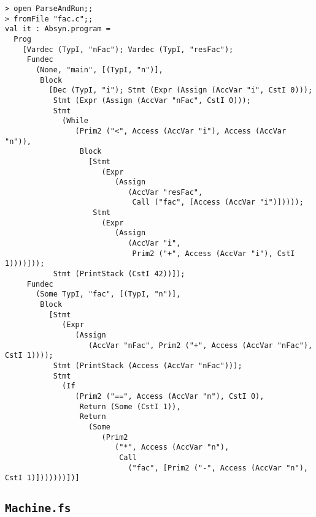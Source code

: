 \bgroup
\footnotesize
\begin{verbatim}
> open ParseAndRun;;
> fromFile "fac.c";;
val it : Absyn.program =
  Prog
    [Vardec (TypI, "nFac"); Vardec (TypI, "resFac");
     Fundec
       (None, "main", [(TypI, "n")],
        Block
          [Dec (TypI, "i"); Stmt (Expr (Assign (AccVar "i", CstI 0)));
           Stmt (Expr (Assign (AccVar "nFac", CstI 0)));
           Stmt
             (While
                (Prim2 ("<", Access (AccVar "i"), Access (AccVar "n")),
                 Block
                   [Stmt
                      (Expr
                         (Assign
                            (AccVar "resFac",
                             Call ("fac", [Access (AccVar "i")]))));
                    Stmt
                      (Expr
                         (Assign
                            (AccVar "i",
                             Prim2 ("+", Access (AccVar "i"), CstI 1))))]));
           Stmt (PrintStack (CstI 42))]);
     Fundec
       (Some TypI, "fac", [(TypI, "n")],
        Block
          [Stmt
             (Expr
                (Assign
                   (AccVar "nFac", Prim2 ("+", Access (AccVar "nFac"), CstI 1))));
           Stmt (PrintStack (Access (AccVar "nFac")));
           Stmt
             (If
                (Prim2 ("==", Access (AccVar "n"), CstI 0),
                 Return (Some (CstI 1)),
                 Return
                   (Some
                      (Prim2
                         ("*", Access (AccVar "n"),
                          Call
                            ("fac", [Prim2 ("-", Access (AccVar "n"), CstI 1)]))))))])]
\end{verbatim}
\egroup

\subsection{\texttt{Machine.fs}}

